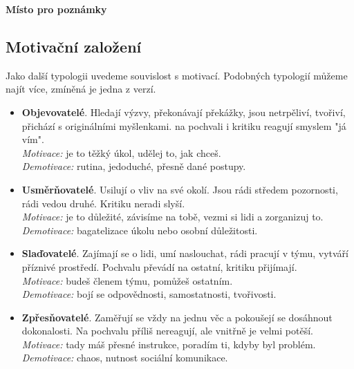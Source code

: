 \documentclass[a4paper,12pt,final]{report}
\begin{document}
\begin{samepage}\begin{flushleft}
\end{flushleft}
\textbf{Místo pro poznámky}
\vspace{3cm}\pagelogos
\end{samepage}

\subsection*{Motivační založení}
Jako další typologii uvedeme souvislost s motivací. Podobných typologií můžeme najít více, zmíněná je jedna z verzí.

\begin{itemize}
 \item \textbf{Objevovatelé}. Hledají výzvy, překonávají překážky, jsou netrpěliví, tvořiví, přichází s originálními myšlenkami. na pochvali i kritiku reagují smyslem "já vím". \\
 \textit{Motivace:} je to těžký úkol, udělej to, jak chceš. \\
 \textit{Demotivace:} rutina, jedoduché, přesně dané postupy.
 
 \item \textbf{Usměrňovatelé}. Usilují o vliv na své okolí. Jsou rádi středem pozornosti, rádi vedou druhé. Kritiku neradi slyší.\\
 \textit{Motivace:} je to důležité, závisíme na tobě, vezmi si lidi a zorganizuj to.\\
 \textit{Demotivace:} bagatelizace úkolu nebo osobní důležitosti.
 
 \item \textbf{Slaďovatelé}. Zajímají se o lidi, umí naslouchat, rádi pracují v týmu, vytváří příznivé prostředí. Pochvalu převádí na ostatní, kritiku přijímají.\\
 \textit{Motivace:} budeš členem týmu, pomůžeš ostatním.\\
 \textit{Demotivace:} bojí se odpovědnosti, samostatnosti, tvořivosti.
 
 \item \textbf{Zpřesňovatelé}. Zaměřují se vždy na jednu věc a pokoušejí se dosáhnout dokonalosti. Na pochvalu příliš nereagují, ale vnitřně je velmi potěší.\\
 \textit{Motivace:} tady máš přesné instrukce, poradím ti, kdyby byl problém.\\
 \textit{Demotivace:} chaos, nutnost sociální komunikace.
\end{itemize}
\end{document}
